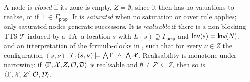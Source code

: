 
%







%
A node is \emph{closed} if its zone is empty, $Z=\emptyset$, since it then has no valuations to
realise, or if $\bot\in\Gamma_{\mathsf{prop}}$. It is
\emph{saturated} when no saturation or cover rule applies; only saturated nodes generate successors.
It is \emph{realisable} if there is a non-blocking TTS $\mathcal T$ induced by a TA, a location $s$ with
$L(s)\supseteq\Gamma_{\mathsf{prop}}$ and $\mathsf{Inv}(s)=\mathsf{Inv}(N)$, and an interpretation of the
formula-clocks in \obligations, such that for every $\nu \in Z$ the configuration $(s,\nu)$  $\mathcal T,(s,\nu)\models\textstyle\bigwedge\Gamma\ \wedge\ \bigwedge\Ctx$. 
Realisability is {monotone under narrowing}: if $\langle \Gamma, \mathcal{X}, Z, \mathcal{O}, \mathcal{D}\rangle$ is realisable and
$\emptyset\neq Z'\subseteq Z$, then so is $\langle \Gamma, \mathcal{X}, Z', \mathcal{O}, \mathcal{D}\rangle$.


